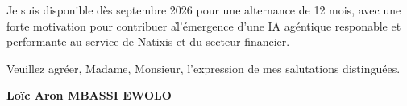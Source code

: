 \documentclass[a4paper,11pt]{article}
\begin{document}
\vspace{0.8em}
\noindent Je suis disponible d\`es septembre 2026 pour une alternance de 12 mois, avec une forte motivation pour contribuer a\` l'\'emergence d'une IA ag\'entique responable et performante au service de Natixis et du secteur financier.

\vspace{1.5em}
\noindent Veuillez agr\'eer, Madame, Monsieur, l'expression de mes salutations distingu\'ees.

\vspace{2em}
\noindent \textbf{Lo\"ic Aron MBASSI EWOLO}
\end{document}
